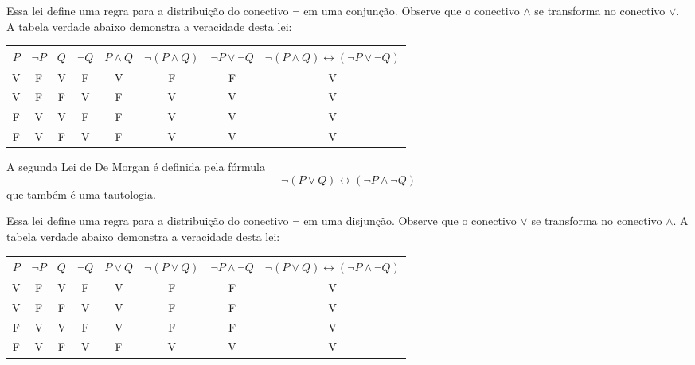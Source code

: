  \vskip0.3cm
 
 Essa lei define uma regra para a distribuição do conectivo $\neg$ em uma conjunção. Observe que o conectivo $\land$ se transforma no conectivo $\lor$. A tabela verdade abaixo demonstra a veracidade desta lei:
 
 \begin{table}[H]
 \centering
 \begin{tabular}{|c|c|c|c|c|c|c|c|} \hline
 \rowcolor{cinza}
 $P$ & $\neg P$ & $Q$ & $\neg Q$ & $P \land Q$ & $\neg (P \land Q)$ & $\neg P \lor \neg Q$ & $\neg(P \land Q) \leftrightarrow (\neg P \lor \neg Q)$ \\ \hline
 V & F & V & F & V & F & F & V \\ \hline
 V & F & F & V & F & V & V & V \\ \hline
 F & V & V & F & F & V & V & V \\ \hline
 F & V & F & V & F & V & V & V \\ \hline
 \end{tabular}
 \end{table}

 \colorbox{azul}{
 \begin{minipage}{14cm}
 \begin{center}
 A segunda Lei de De Morgan é definida pela fórmula
 \[\neg(P \lor Q) \leftrightarrow (\neg P \land \neg Q)\]
 que também é uma tautologia. 
 \end{center}
 \end{minipage}}
 
 \vskip0.3cm
 
 Essa lei define uma regra para a distribuição do conectivo $\neg$ em uma disjunção. Observe que o conectivo $\lor$ se transforma no conectivo $\land$. A tabela verdade abaixo demonstra a veracidade desta lei:
 
 \begin{table}[H]
 \centering
 \begin{tabular}{|c|c|c|c|c|c|c|c|} \hline
 \rowcolor{cinza}
 $P$ & $\neg P$ & $Q$ & $\neg Q$ & $P \lor Q$ & $\neg (P \lor Q)$ & $\neg P \land \neg Q$ & $\neg(P \lor Q) \leftrightarrow (\neg P \land \neg Q)$ \\ \hline
 V & F & V & F & V & F & F & V \\ \hline
 V & F & F & V & V & F & F & V \\ \hline
 F & V & V & F & V & F & F & V \\ \hline
 F & V & F & V & F & V & V & V \\ \hline
 \end{tabular}
\end{table}

